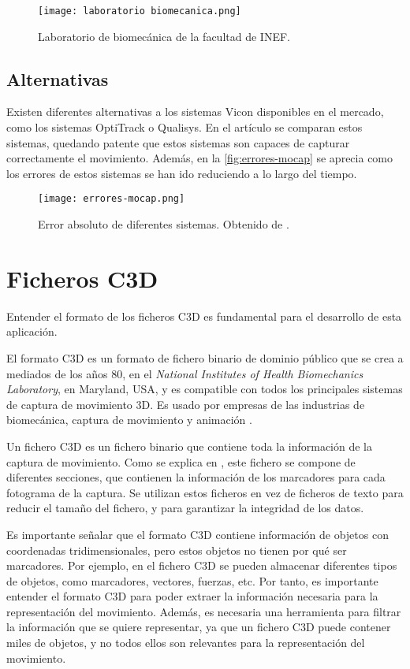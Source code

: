 \begin{figure}[H]
    \centering
    \texttt{[image: laboratorio biomecanica.png]}
    \caption{Laboratorio de biomecánica de la facultad de \ac{INEF}.}
    \label{fig:laboratorio}
\end{figure}

\subsection{Alternativas}
Existen diferentes alternativas a los sistemas Vicon disponibles en el mercado, como los sistemas OptiTrack o Qualisys. En el artículo \autocite{article} se comparan estos sistemas, quedando patente que estos sistemas son capaces de capturar correctamente el movimiento. Además, en la \autoref{fig:errores-mocap} se aprecia como los errores de estos sistemas se han ido reduciendo a lo largo del tiempo.

\begin{figure}[H]
    \centering
    \texttt{[image: errores-mocap.png]}
    \caption{Error absoluto de diferentes sistemas. Obtenido de \autocite{article}.}
    \label{fig:errores-mocap}
\end{figure}

\section{Ficheros \acs{C3D}} \label{sec:ficheros-c3d}
Entender el formato de los ficheros \ac{C3D} es fundamental para el desarrollo de esta aplicación. 

El formato \ac{C3D} es un formato de fichero binario de dominio público que se crea a mediados de los años 80, en el \textit{National Institutes of Health Biomechanics Laboratory}, en Maryland, USA, y es compatible con todos los principales sistemas de captura de movimiento 3D. Es usado por empresas de las industrias de biomecánica, captura de movimiento y animación \autocite{C3DORGBiomechanicsStandard}.

Un fichero \ac{C3D} es un fichero binario que contiene toda la información de la captura de movimiento. Como se explica en \autocite{C3DORGBiomechanicsStandard}, este fichero se compone de diferentes secciones, que contienen la información de los marcadores para cada fotograma de la captura. Se utilizan estos ficheros en vez de ficheros de texto para reducir el tamaño del fichero, y para garantizar la integridad de los datos.

Es importante señalar que el formato \ac{C3D} contiene información de objetos con coordenadas tridimensionales, pero estos objetos no tienen por qué ser marcadores. Por ejemplo, en el fichero \ac{C3D} se pueden almacenar diferentes tipos de objetos, como marcadores, vectores, fuerzas, etc. Por tanto, es importante entender el formato \ac{C3D} para poder extraer la información necesaria para la representación del movimiento. Además, es necesaria una herramienta para filtrar la información que se quiere representar, ya que un fichero \ac{C3D} puede contener miles de objetos, y no todos ellos son relevantes para la representación del movimiento.

